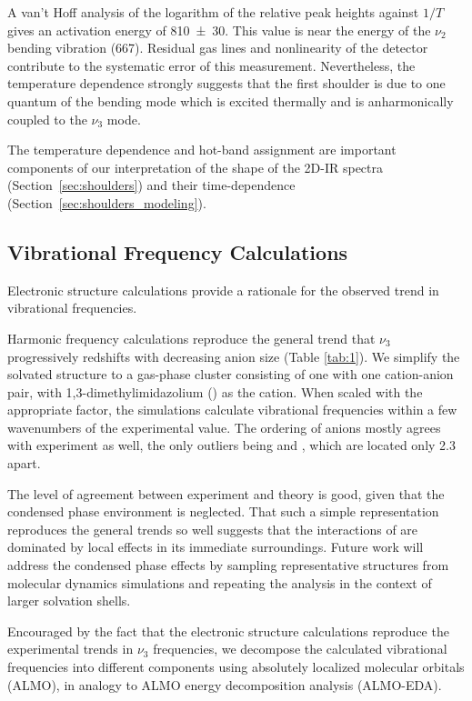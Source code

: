 A van't Hoff analysis of the logarithm of the relative peak heights against $1/T$ gives an activation energy of \SI[multi-part-units = single]{810(30)}{\wavenumber}. This value is near the energy of the $\nu_2$ bending vibration (\SI{667}{\wavenumber}). Residual gas lines and nonlinearity of the detector contribute to the systematic error of this measurement. Nevertheless, the temperature dependence strongly suggests that the first shoulder is due to one quantum of the bending mode which is excited thermally and is anharmonically coupled to the $\nu_3$ mode.

The temperature dependence and hot-band assignment are important components of our interpretation of the shape of the 2D-IR spectra (Section~\ref{sec:shoulders}) and their time-dependence (Section~\ref{sec:shoulders_modeling}).


\subsection{Vibrational Frequency Calculations}
\label{sec:vib_calcs}
Electronic structure calculations provide a rationale for the observed trend in vibrational frequencies.

Harmonic frequency calculations reproduce the general trend that $\nu_3$ progressively redshifts with decreasing anion size (Table \ref{tab:1}).  We simplify the solvated  structure to a gas-phase cluster consisting of one  with one cation-anion pair, with 1,3-dimethylimidazolium () as the cation. When scaled with the appropriate factor\cite{Merrick2007}, the simulations calculate vibrational frequencies within a few wavenumbers of the experimental value. The ordering of anions mostly agrees with experiment as well, the only outliers being \ce{[TFA]-} and \ce{[SCN]-}, which are located only \SI{2.3}{\wavenumber} apart.

The level of agreement between experiment and theory is good, given that the condensed phase environment is neglected. That such a simple representation reproduces the general trends so well suggests that the interactions of  are dominated by local effects in its immediate surroundings. Future work will address the condensed phase effects by sampling representative structures from molecular dynamics simulations and repeating the analysis in the context of larger solvation shells.

Encouraged by the fact that the electronic structure calculations reproduce the experimental trends in $\nu_{3}$ frequencies, we decompose the calculated vibrational frequencies into different components using absolutely localized molecular orbitals (ALMO), in analogy to ALMO energy decomposition analysis (ALMO-EDA).\cite{Khaliullin2006,Khaliullin2007,Khaliullin2008}

